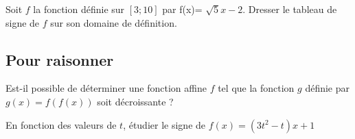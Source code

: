 \documentclass[20pt]{article}
\begin{document}
\Exe

Soit $f$ la fonction définie sur $[3;10]$ par f(x)= $\sqrt{5}x-2$.
Dresser le tableau de signe de $f$ sur son domaine de définition.



\subsection{Pour raisonner}


Est-il possible de déterminer une fonction affine $f$ tel que la fonction $g$ définie par $g(x)=f(f(x))$ soit décroissante ?


En fonction des valeurs de $t$, étudier le signe de $f(x)=(3t^2-t)x+1$
\end{document}
